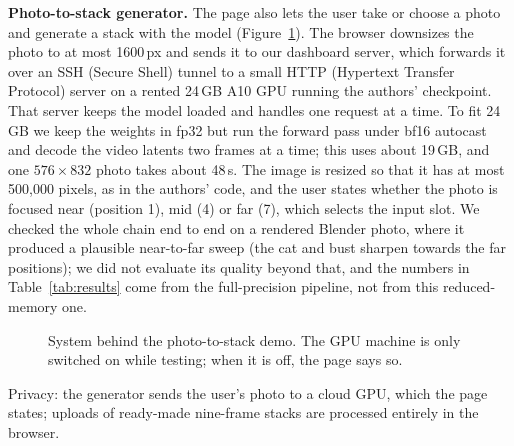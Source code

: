 \documentclass[11pt]{article}
\begin{document}
\textbf{Photo-to-stack generator.} The page also lets the user take or choose a photo and generate a stack with the model (Figure~\ref{fig:system}). The browser downsizes the photo to at most 1600\,px and sends it to our dashboard server, which forwards it over an SSH (Secure Shell) tunnel to a small HTTP (Hypertext Transfer Protocol) server on a rented 24\,GB A10 GPU running the authors' checkpoint. That server keeps the model loaded and handles one request at a time. To fit 24\,GB we keep the weights in fp32 but run the forward pass under bf16 autocast and decode the video latents two frames at a time; this uses about 19\,GB, and one $576\times832$ photo takes about 48\,s. The image is resized so that it has at most 500{,}000 pixels, as in the authors' code, and the user states whether the photo is focused near (position 1), mid (4) or far (7), which selects the input slot. We checked the whole chain end to end on a rendered Blender photo, where it produced a plausible near-to-far sweep (the cat and bust sharpen towards the far positions); we did not evaluate its quality beyond that, and the numbers in Table~\ref{tab:results} come from the full-precision pipeline, not from this reduced-memory one.
\begin{figure}[tbp]\centering
{}
\caption{System behind the photo-to-stack demo. The GPU machine is only switched on while testing; when it is off, the page says so.}\label{fig:system}
\end{figure}
Privacy: the generator sends the user's photo to a cloud GPU, which the page states; uploads of ready-made nine-frame stacks are processed entirely in the browser.
\end{document}
